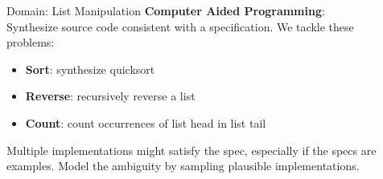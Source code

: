 \documentclass[final]{beamer}
\newlength{\sepwid}
\newlength{\onecolwid}
\newlength{\twocolwid}
\begin{document}
\begin{frame}[t]
\begin{columns}[t]
\begin{column}{\twocolwid}

\begin{columns}[t,totalwidth=\twocolwid] %


\begin{column}{\onecolwid} %




\end{column} %

\end{columns} %

\end{column} %

\begin{column}{\sepwid}\end{column} %

\begin{column}{\onecolwid} %


  \begin{block}{Domain: List Manipulation}
    \textbf{Computer Aided Programming}: Synthesize source code consistent with a specification.
    We tackle these problems:
    \begin{itemize}
    \item \textbf{Sort}: synthesize quicksort
    \item \textbf{Reverse}: recursively reverse a list
    \item \textbf{Count}: count occurrences of list head in list tail
    \end{itemize}
    Multiple implementations might satisfy the spec, especially if the specs are examples.
    Model the ambiguity by sampling plausible implementations.

  \end{block}


\end{column}
\end{columns}
\end{frame}
\end{document}
